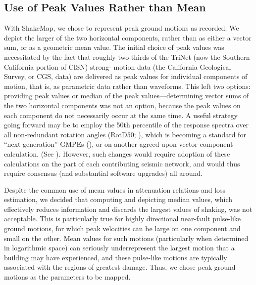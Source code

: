 \documentclass[letterpaper,10pt,english]{sphinxmanual}
\begin{document}
\subsection{Use of Peak Values Rather than Mean}
\label{tg_choice_of_parameters:use-of-peak-values-rather-than-mean}\label{tg_choice_of_parameters:peak-values-vs-mean}
With ShakeMap, we chose to represent peak ground motions as recorded. We depict the
larger of the two horizontal components, rather than as either a vector sum, or as a
geometric mean value. The initial choice of peak values was necessitated by the fact that
roughly two-thirds of the TriNet (now the Southern California portion of CISN) strong-
motion data (the California Geological Survey, or CGS, data)
are delivered as peak values for individual components of
motion, that is, as parametric data rather than waveforms. This left two options: providing peak
values or median of the peak values---determining vector sums of the two horizontal
components was not an option, because the peak values on each component do not
necessarily occur at the same time.  A useful strategy going forward may be to employ
the 50th percentile of the response spectra over all non-redundant rotation angles
(RotD50; {\hyperref[references:boore2010]{}}), which is becoming a standard
for ``next-generation''
GMPEs ({\hyperref[references:abrahamson2014]{}}), or on another
agreed-upon vector-component
calculation. (See {\hyperref[future_directions:future\string-directions]{}}). However, such changes would
require adoption of these
calculations on the part of each contributing seismic network, and would thus require
consensus (and substantial software upgrades) all around.

Despite the common use of mean values in attenuation relations and loss estimation, we
decided that computing and depicting median values, which effectively reduces
information and discards the largest values of shaking, was not acceptable. This is
particularly true for highly directional near-fault pulse-like ground motions, for which
peak velocities can be large on one component and small on the other.  Mean values for
such motions (particularly when determined in logarithmic space) can seriously underrepresent
the largest motion that a building may have experienced, and these pulse-like motions are
typically associated with the regions of greatest damage. Thus, we chose peak ground
motions as the parameters to be mapped.
\end{document}
